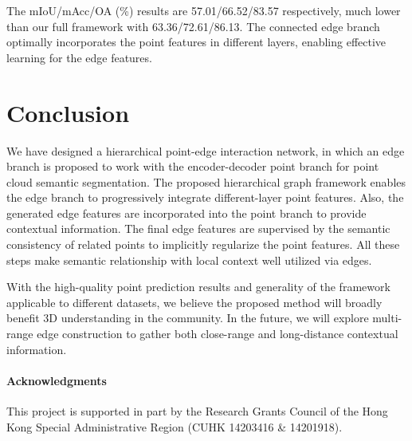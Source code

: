 \documentclass[10pt,twocolumn,letterpaper]{article}
\begin{document}
The mIoU/mAcc/OA (\%) results are 57.01/66.52/83.57 respectively, much lower than our full framework with 63.36/72.61/86.13. The connected edge branch optimally incorporates the point features in different layers, enabling effective learning for the edge features. 

\vspace{-1mm}
\section{Conclusion}
We have designed a hierarchical point-edge interaction network, in which an edge branch is proposed to work with the encoder-decoder point branch for point cloud semantic segmentation. The proposed hierarchical graph framework enables the edge branch to progressively integrate different-layer point features. Also, the generated edge features are incorporated into the point branch to provide contextual information. The final edge features are supervised by the semantic consistency of related points to implicitly regularize the point features. All these steps make semantic relationship with local context well utilized via edges.

With the high-quality point prediction results and generality of the framework applicable to different datasets, we believe the proposed method will broadly benefit 3D understanding in the community. In the future, we will explore multi-range edge construction to gather both close-range and long-distance contextual information.


\paragraph{Acknowledgments}
This project is supported in part by the Research Grants Council of the Hong Kong Special Administrative Region (CUHK 14203416 \& 14201918).

{\small
	
	
}
\end{document}
